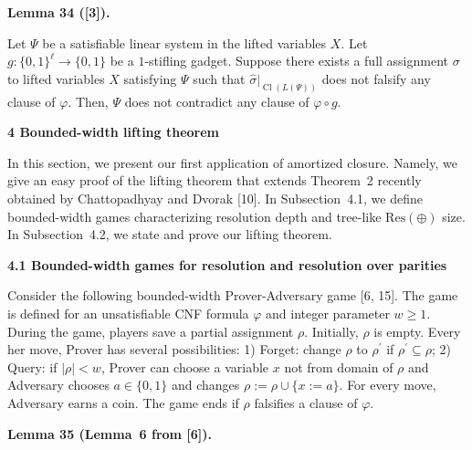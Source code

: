 \par\medskip\noindent\textbf{
Lemma 34 ([3]).
}\par



Let $\Psi$ be a satisfiable linear system in the lifted variables $X$. Let $g\colon\{0,1\}^{\ell}\to\{0,1\}$ be a $1$-stifling gadget. Suppose there exists a full assignment $\sigma$ to lifted variables $X$ satisfying $\Psi$ such that $\hat{\sigma}|_{\mathop{\mathrm{Cl}}(L(\Psi))}$ does not falsify any clause of $\varphi$. Then, $\Psi$ does not contradict any clause of $\varphi\circ g$.\par



\par\medskip\noindent\textbf{
4 Bounded-width lifting theorem}\par


In this section, we present our first application of amortized closure. Namely, we give an easy proof of the lifting theorem that extends Theorem 2 recently obtained by Chattopadhyay and Dvorak [10].
In Subsection 4.1, we define bounded-width games characterizing resolution depth and tree-like $\mathrm{Res}(\oplus)$ size. In Subsection 4.2, we state and prove our lifting theorem.\par


\par\medskip\noindent\textbf{
4.1 Bounded-width games for resolution and resolution over parities}\par


Consider the following bounded-width Prover-Adversary game [6, 15]. The game is defined for an unsatisfiable CNF formula $\varphi$ and integer parameter $w\geq 1$. During the game, players save a partial assignment $\rho$. Initially, $\rho$ is empty.
Every her move, Prover has several possibilities:
1) Forget: change $\rho$ to $\rho^{\prime}$ if $\rho^{\prime}\subseteq\rho$;
2) Query: if $|\rho|<w$, Prover can choose a variable $x$ not from domain of $\rho$ and Adversary chooses $a\in\{0,1\}$ and changes $\rho:=\rho\cup\{x:=a\}$. For every move, Adversary earns a coin. The game ends if $\rho$ falsifies a clause of $\varphi$.\par



\par\medskip\noindent\textbf{
Lemma 35 (Lemma 6 from [6]).
}\par



